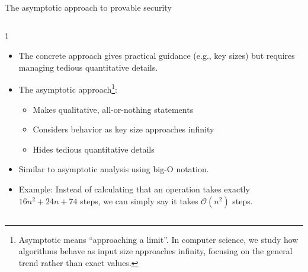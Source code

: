 \ifdefined\PRESENTATION\else\PassOptionsToClass{handout}{beamer}\fi\documentclass[aspectratio=169, lualatex]{beamer}
\begin{document}
\begin{frame}{The asymptotic approach to provable security}
	\begin{columns}
		\begin{column}{1\textwidth}
			\begin{itemize}
				\item The concrete approach gives practical guidance (e.g., key sizes) but requires managing tedious quantitative details.
				\item The asymptotic approach\footnote{Asymptotic means ``approaching a limit''. In computer science, we study how algorithms behave as input size approaches infinity, focusing on the general trend rather than exact values.}:
				      \begin{itemize}
					      \item Makes qualitative, all-or-nothing statements
					      \item Considers behavior as key size approaches infinity
					      \item Hides tedious quantitative details
				      \end{itemize}
				\item Similar to asymptotic analysis using big-O notation.
				\item Example: Instead of calculating that an operation takes exactly $16n^2 + 24n + 74$ steps, we can simply say it takes $\mathcal{O}(n^2)$ steps.
			\end{itemize}
		\end{column}
	\end{columns}
\end{frame}
\end{document}
